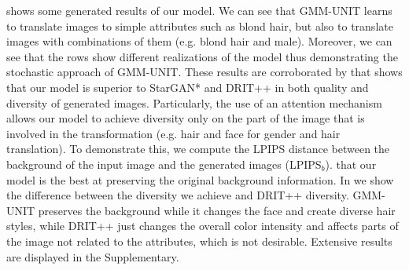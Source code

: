 \documentclass[runningheads]{llncs}
\begin{document}
 shows some generated results of our model. We can see that GMM-UNIT learns to translate images to simple attributes such as blond hair, but also to translate images with combinations of them (e.g. blond hair and male). Moreover, we can see that the rows show different realizations of the model thus demonstrating the stochastic approach of GMM-UNIT.
These results are corroborated by  that shows that our model is superior to StarGAN* and DRIT++ in both quality and diversity of generated images. 
Particularly, the use of an attention mechanism allows our model to achieve diversity only on the part of the image that is involved in the transformation (e.g. hair and face for gender and hair translation). To demonstrate this, we compute the LPIPS distance between the background of the input image and the generated images (LPIPS$_b$).  that our model is the best at preserving the original background information. In  we show the difference between the diversity we achieve and DRIT++ diversity. GMM-UNIT preserves the background while it changes the face and create diverse hair styles, while DRIT++ just changes the overall color intensity and affects parts of the image not related to the attributes, which is not desirable.
Extensive results are displayed in the Supplementary. 
\end{document}
